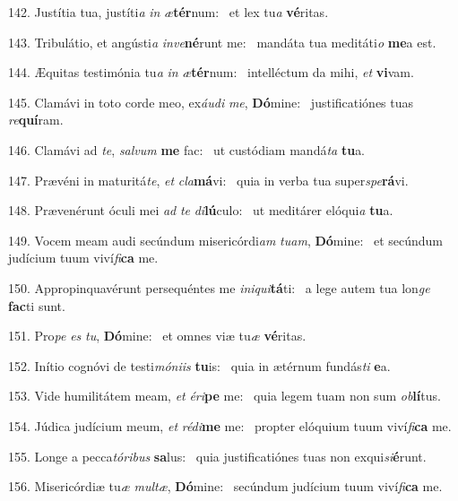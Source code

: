 142. Justítia tua, justíti\textit{a} \textit{in} \textit{æ}\textbf{tér}num: \ast\  et lex tu\textit{a} \textbf{vé}ritas.\

143. Tribulátio, et angústi\textit{a} \textit{in}\textit{ve}\textbf{né}runt me: \ast\  mandáta tua meditáti\textit{o} \textbf{me}a est.\

144. Æquitas testimónia tu\textit{a} \textit{in} \textit{æ}\textbf{tér}num: \ast\  intelléctum da mihi, \textit{et} \textbf{vi}vam.\

145. Clamávi in toto corde meo, ex\textit{áu}\textit{di} \textit{me}, \textbf{Dó}mine: \ast\  justificatiónes tuas \textit{re}\textbf{quí}ram.\

146. Clamávi ad \textit{te}, \textit{sal}\textit{vum} \textbf{me} fac: \ast\  ut custódiam mandá\textit{ta} \textbf{tu}a.\

147. Prævéni in maturitá\textit{te}, \textit{et} \textit{cla}\textbf{má}vi: \ast\  quia in verba tua super\textit{spe}\textbf{rá}vi.\

148. Prævenérunt óculi mei \textit{ad} \textit{te} \textit{di}\textbf{lú}culo: \ast\  ut meditárer elóqui\textit{a} \textbf{tu}a.\

149. Vocem meam audi secúndum misericórdi\textit{am} \textit{tu}\textit{am}, \textbf{Dó}mine: \ast\  et secúndum judícium tuum viví\textit{fi}\textbf{ca} me.\

150. Appropinquavérunt persequéntes me \textit{in}\textit{i}\textit{qui}\textbf{tá}ti: \ast\  a lege autem tua lon\textit{ge} \textbf{fac}ti sunt.\

151. Pro\textit{pe} \textit{es} \textit{tu}, \textbf{Dó}mine: \ast\  et omnes viæ tu\textit{æ} \textbf{vé}ritas.\

152. Inítio cognóvi de testi\textit{mó}\textit{ni}\textit{is} \textbf{tu}is: \ast\  quia in ætérnum fundás\textit{ti} \textbf{e}a.\

153. Vide humilitátem meam, \textit{et} \textit{é}\textit{ri}\textbf{pe} me: \ast\  quia legem tuam non sum \textit{ob}\textbf{lí}tus.\

154. Júdica judícium meum, \textit{et} \textit{réd}\textit{i}\textbf{me} me: \ast\  propter elóquium tuum viví\textit{fi}\textbf{ca} me.\

155. Longe a pecca\textit{tó}\textit{ri}\textit{bus} \textbf{sa}lus: \ast\  quia justificatiónes tuas non exqui\textit{si}\textbf{é}runt.\

156. Misericórdiæ tu\textit{æ} \textit{mul}\textit{tæ}, \textbf{Dó}mine: \ast\  secúndum judícium tuum viví\textit{fi}\textbf{ca} me.\

